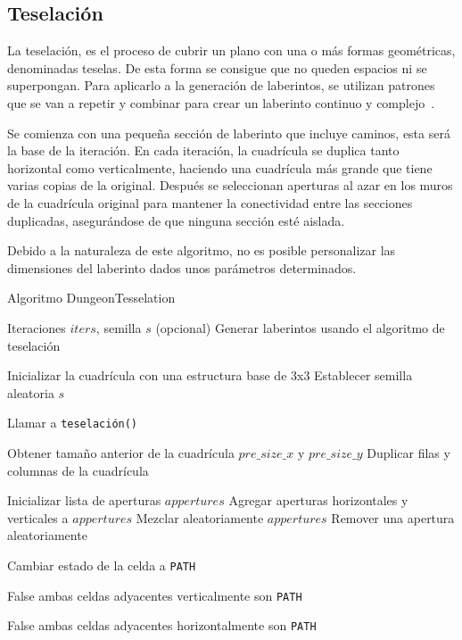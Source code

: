 \subsection{Teselación}
La teselación, es el proceso de cubrir un plano con una o más formas geométricas, denominadas teselas. De esta forma se consigue que no queden espacios ni se superpongan. Para aplicarlo a la generación de laberintos, se utilizan patrones que se van a repetir y combinar para crear un laberinto continuo y complejo~\cite{wikipediaMazeGeneration}.

Se comienza con una pequeña sección de laberinto que incluye caminos, esta será la base de la iteración. En cada iteración, la cuadrícula se duplica tanto horizontal como verticalmente, haciendo una cuadrícula más grande que tiene varias copias de la original. Después se seleccionan aperturas al azar en los muros de la cuadrícula original para mantener la conectividad entre las secciones duplicadas, asegurándose de que ninguna sección esté aislada. 

Debido a la naturaleza de este algoritmo, no es posible personalizar las dimensiones del laberinto dados unos parámetros determinados.


\begin{algorithm}
\caption{Algoritmo DungeonTesselation}
\begin{algorithmic}[1]
\Require Iteraciones $iters$, semilla $s$ (opcional)
\Ensure Generar laberintos usando el algoritmo de teselación

\State Inicializar la cuadrícula con una estructura base de 3x3
    \State Establecer semilla aleatoria $s$
\EndIf

    \State Llamar a \texttt{teselación()}
\EndFor

    \State Obtener tamaño anterior de la cuadrícula $pre\_size\_x$ y $pre\_size\_y$
    \State Duplicar filas y columnas de la cuadrícula

    \State Inicializar lista de aperturas $appertures$
    \State Agregar aperturas horizontales y verticales a $appertures$
    \State Mezclar aleatoriamente $appertures$
    \State Remover una apertura aleatoriamente

        \State Cambiar estado de la celda a \texttt{PATH}
    \EndFor
\EndProcedure

        \State \Return False
    \EndIf
    \State \Return ambas celdas adyacentes verticalmente son \texttt{PATH}
\EndFunction

        \State \Return False
    \EndIf
    \State \Return ambas celdas adyacentes horizontalmente son \texttt{PATH}
\EndFunction

\end{algorithmic}
\end{algorithm}



